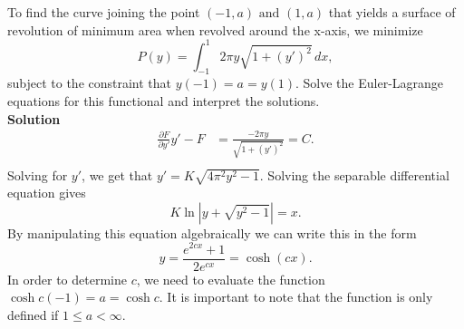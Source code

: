\begin{exercise}{3}
To find the curve joining the point $(-1, a) \text{ and } (1, a)$ that yields a surface of revolution of minimum area when revolved around the x-axis, we minimize
$$P(y) = \int_{-1}^{1} 2 \pi y \sqrt{1 + (y')^2} \, dx,$$
subject to the constraint that $y(-1) = a = y(1)$. Solve the Euler-Lagrange equations for this functional and interpret the solutions.
\\
\textbf{Solution}
\begin{align*}
	\frac{\partial{F}}{\partial{y'}}y' - F &= \frac{-2 \pi y}{\sqrt{1 + (y')^2}} = C. \\
\end{align*}
Solving for $y'$, we get that $y' = K \sqrt{4 \pi^2 y^2 - 1}$. Solving the separable differential equation gives 
$$K \ln |y + \sqrt{y^2 - 1}| = x.$$
By manipulating this equation algebraically we can write this in the form $$ y = \frac{e^{2cx} + 1}{2e^{cx}} = \cosh{(cx)}.$$ 
In order to determine $c$, we need to evaluate the function $\cosh{c(-1)} = a = \cosh{c}$. It is important to note that the function is only defined if $1 \leq a < \infty.$
\end{exercise}